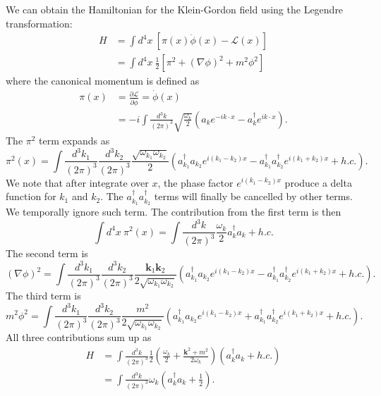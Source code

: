 \documentclass[aps,prb,superscriptaddress,nofootinbib]{revtex4}
\begin{document}
We can obtain the Hamiltonian for the Klein-Gordon field using the Legendre transformation:
\begin{equation}
\begin{aligned}
	H &= \int d^4 x\ \left[\pi(x) \dot{\phi}(x) - \mathcal L(x) \right] \\
	&= \int d^4 x\ \frac{1}{2} \left[\pi^2 + (\nabla \phi)^2 + m^2 \phi^2 \right]
\end{aligned}
\end{equation}
where the canonical momentum is defined as
\begin{equation}
\begin{aligned}
	\pi(x) &= \frac{\partial \mathcal L}{\partial \dot{\phi}} = \dot{\phi}(x) \\
	&= -i\int \frac{d^{3} k}{(2\pi)^{3}} \sqrt{\frac{\omega_{k}}{2}}\left(a_k 
		e^{-i k \cdot x} - a_k^{\dagger} e^{i k \cdot x}\right).
\end{aligned}
\end{equation}
The $\pi^2$ term expands as
\begin{equation}
	\pi^2(x) = \int \frac{d^{3} k_1}{(2\pi)^{3}} \frac{d^{3} k_2}{(2\pi)^{3}}
		\frac{\sqrt{\omega_{k_1} \omega_{k_2}}}{2} \left(a^\dagger_{k_1}a_{k_2}e^{i(k_1-k_2)x} - a^\dagger_{k_1} a^\dagger_{k_2} e^{i(k_1+k_2)x} + h.c.\right).
\end{equation}
We note that after integrate over $x$, the phase factor $e^{i(k_1-k_2)x}$ produce a delta function for $k_1$ and $k_2$.
The $a^\dagger_{k_1} a^\dagger_{k_2}$ terms will finally be cancelled by other terms.
We temporally ignore such term.
The contribution from the first term is then
\begin{equation}
	\int d^4 x\ \pi^2(x) = \int \frac{d^3 k}{(2\pi)^3} \frac{\omega_k}{2} a_k^\dagger a_k + h.c.
\end{equation}
The second term is
\begin{equation}
	(\nabla \phi)^2 = \int \frac{d^{3} k_1}{(2\pi)^{3}} \frac{d^{3} k_2}{(2\pi)^{3}}
		\frac{\bm k_1 \bm k_2}{2\sqrt{\omega_{k_1}\omega_{k_2}}} \left(a^\dagger_{k_1}a_{k_2}e^{i(k_1-k_2)x} - a^\dagger_{k_1} a^\dagger_{k_2} e^{i(k_1+k_2)x} + h.c.\right).
\end{equation}
The third term is
\begin{equation}
	m^2 \phi^2 = \int \frac{d^{3} k_1}{(2\pi)^{3}} \frac{d^{3} k_2}{(2\pi)^{3}}
		\frac{m^2}{2\sqrt{\omega_{k_1}\omega_{k_2}}} \left(a^\dagger_{k_1}a_{k_2}e^{i(k_1-k_2)x} + a^\dagger_{k_1} a^\dagger_{k_2} e^{i(k_1+k_2)x} + h.c.\right).
\end{equation}
All three contributions sum up as
\begin{equation}
\begin{aligned}
	H &= \int \frac{d^3 k}{(2\pi)^3} \frac{1}{2}\left(\frac{\omega_k}{2} + \frac{\bm k^2+m^2}{2 \omega_k}\right) \left(a_k^\dagger a_k + h.c. \right) \\
	&= \int \frac{d^3 k}{(2\pi)^3} \omega_k \left(a_k^\dagger a_k +\frac{1}{2} \right).
\end{aligned}
\end{equation}
\end{document}
